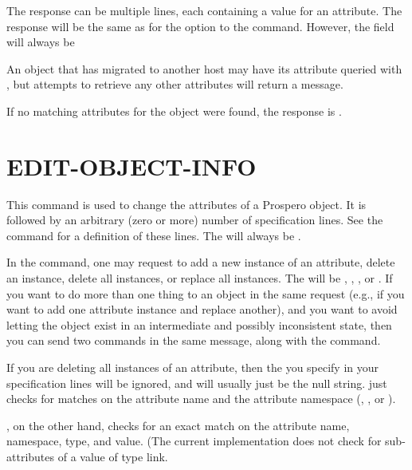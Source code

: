 The response can be multiple lines, each containing a value for an
attribute.  The response will be the same as for the 
option to the  command.  However, the 
field will always be 

An object that has migrated to another host may have its
 attribute queried with ,
but attempts to retrieve any other attributes will return a
 message.

If no matching attributes for the object were found, the response is
. 

\section{EDIT-OBJECT-INFO}

\begin{command}
  \commandsize
   
  
\end{command}

This command is used to change the attributes of a Prospero object.
It is followed by an arbitrary (zero or more) number of
 specification lines.  See the
 command for a definition of these lines.    The
 will always be .

In the command, one may request to add a new instance of an attribute, delete
an instance, delete all instances, or replace all instances.  The
 will be , ,
, or .  If you want to do more than one
thing to an object in 
the same request (e.g., if you want to add one attribute instance and
replace another), and you want to avoid letting the object exist in an
intermediate and possibly inconsistent state, then you can send two
 commands in the same message, along with the
 command.

If you are deleting all instances of an attribute, then the
 you specify in your 
specification lines will be ignored, and will usually just be the null
string.   just checks for matches on the attribute
name and the attribute namespace (, , or
). 

, on the other hand, checks for an exact match on the
attribute name, namespace, type, and value.  (The current
implementation does not check for sub-attributes of a value of type
link.  

